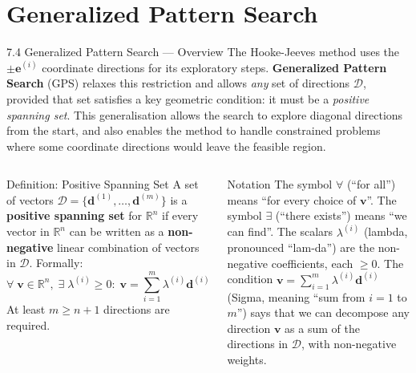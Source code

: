 \documentclass[aspectratio=169,10pt]{beamer}
\begin{document}
\section{Generalized Pattern Search}

\begin{frame}[allowframebreaks]{7.4 Generalized Pattern Search --- Overview}
  The Hooke-Jeeves method uses the $\pm\mathbf{e}^{(i)}$ coordinate
  directions for its exploratory steps.  \textbf{Generalized Pattern
  Search} (GPS) relaxes this restriction and allows \emph{any} set of
  directions $\mathcal{D}$, provided that set satisfies a key
  geometric condition: it must be a \emph{positive spanning set}.
  This generalisation allows the search to explore diagonal directions
  from the start, and also enables the method to handle constrained
  problems where some coordinate directions would leave the feasible
  region.

  \begin{columns}[T]
      \begin{block}{Definition: Positive Spanning Set}
        A set of vectors
        $\mathcal{D} = \{\mathbf{d}^{(1)},\ldots,\mathbf{d}^{(m)}\}$
        is a \textbf{positive spanning set} for $\mathbb{R}^n$ if
        every vector in $\mathbb{R}^n$ can be written as a
        \textbf{non-negative} linear combination of vectors in
        $\mathcal{D}$.  Formally:
        \[
          \forall\;\mathbf{v} \in \mathbb{R}^n,\;
          \exists\; \lambda^{(i)} \ge 0:\;
          \mathbf{v} = \sum_{i=1}^m \lambda^{(i)} \mathbf{d}^{(i)}
        \]
        At least $m \ge n+1$ directions are required.
      \end{block}

      \begin{block}{Notation}
        The symbol $\forall$ (``for all'') means ``for every choice of
        $\mathbf{v}$''.  The symbol $\exists$ (``there exists'') means
        ``we can find''.  The scalars $\lambda^{(i)}$ (lambda,
        pronounced ``lam-da'') are the non-negative coefficients, each
        $\geq 0$.  The condition $\mathbf{v} = \sum_{i=1}^m \lambda^{(i)}
        \mathbf{d}^{(i)}$ (Sigma, meaning ``sum from $i=1$ to $m$'')
        says that we can decompose any direction $\mathbf{v}$ as a
        sum of the directions in $\mathcal{D}$, with non-negative weights.
      \end{block}


\end{columns}
\end{frame}
\end{document}
